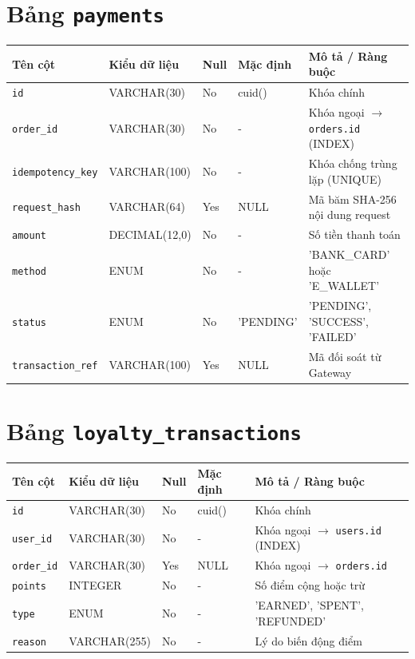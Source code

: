 \documentclass[12pt,a4paper,oneside]{report}
\begin{document}
\section{Bảng \texttt{payments}}
\begin{table}[H]
\centering
\small
\begin{tabularx}{\textwidth}{llllX}
\toprule
\textbf{Tên cột} & \textbf{Kiểu dữ liệu} & \textbf{Null} & \textbf{Mặc định} & \textbf{Mô tả / Ràng buộc} \\
\midrule
\texttt{id} & VARCHAR(30) & No & cuid() & Khóa chính \\
\texttt{order\_id} & VARCHAR(30) & No & - & Khóa ngoại \(\to\) \texttt{orders.id} (INDEX) \\
\texttt{idempotency\_key} & VARCHAR(100) & No & - & Khóa chống trùng lặp (UNIQUE) \\
\texttt{request\_hash} & VARCHAR(64) & Yes & NULL & Mã băm SHA-256 nội dung request \\
\texttt{amount} & DECIMAL(12,0) & No & - & Số tiền thanh toán \\
\texttt{method} & ENUM & No & - & 'BANK\_CARD' hoặc 'E\_WALLET' \\
\texttt{status} & ENUM & No & 'PENDING' & 'PENDING', 'SUCCESS', 'FAILED' \\
\texttt{transaction\_ref} & VARCHAR(100) & Yes & NULL & Mã đối soát từ Gateway \\
\bottomrule
\end{tabularx}
\end{table}

\section{Bảng \texttt{loyalty\_transactions}}
\begin{table}[H]
\centering
\small
\begin{tabularx}{\textwidth}{llllX}
\toprule
\textbf{Tên cột} & \textbf{Kiểu dữ liệu} & \textbf{Null} & \textbf{Mặc định} & \textbf{Mô tả / Ràng buộc} \\
\midrule
\texttt{id} & VARCHAR(30) & No & cuid() & Khóa chính \\
\texttt{user\_id} & VARCHAR(30) & No & - & Khóa ngoại \(\to\) \texttt{users.id} (INDEX) \\
\texttt{order\_id} & VARCHAR(30) & Yes & NULL & Khóa ngoại \(\to\) \texttt{orders.id} \\
\texttt{points} & INTEGER & No & - & Số điểm cộng hoặc trừ \\
\texttt{type} & ENUM & No & - & 'EARNED', 'SPENT', 'REFUNDED' \\
\texttt{reason} & VARCHAR(255) & No & - & Lý do biến động điểm \\
\bottomrule
\end{tabularx}
\end{table}
\end{document}
